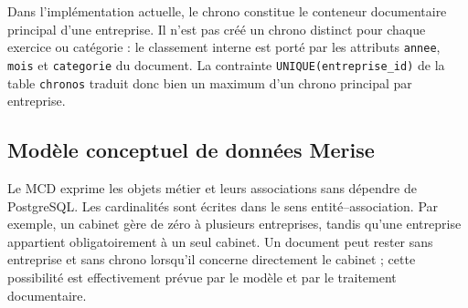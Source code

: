 \documentclass[12pt,a4paper,oneside]{report}
\begin{document}
Dans l'implémentation actuelle, le chrono constitue le conteneur documentaire principal d'une entreprise. Il n'est pas créé un chrono distinct pour chaque exercice ou catégorie : le classement interne est porté par les attributs \texttt{annee}, \texttt{mois} et \texttt{categorie} du document. La contrainte \texttt{UNIQUE(entreprise\_id)} de la table \texttt{chronos} traduit donc bien un maximum d'un chrono principal par entreprise.

\subsection{Modèle conceptuel de données Merise}

Le MCD exprime les objets métier et leurs associations sans dépendre de PostgreSQL. Les cardinalités sont écrites dans le sens entité--association. Par exemple, un cabinet gère de zéro à plusieurs entreprises, tandis qu'une entreprise appartient obligatoirement à un seul cabinet. Un document peut rester sans entreprise et sans chrono lorsqu'il concerne directement le cabinet ; cette possibilité est effectivement prévue par le modèle et par le traitement documentaire.
\end{document}
